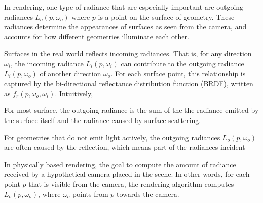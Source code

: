 In rendering, one type of radiance that are especially important are outgoing radiances $L_o(p,\omega_o)$ where $p$ is a point on the surface of geometry. These radiances determine the appearances of surfaces as seen from the camera, and accounts for how different geometries illuminate each other. 

Surfaces in the real world reflects incoming radiances. That is, for any direction $\omega_i$, the incoming radiance $L_i(p,\omega_i)$ can contribute to the outgoing radiance $L_i(p,\omega_o)$ of another direction $\omega_o$. For each surface point, this relationship is captured by the bi-directional reflectance distribution function (BRDF), written as $f_r(p,\omega_o,\omega_i)$. Intuitively, 


For most surface, the outgoing radiance is the sum of the the radiance emitted by the surface itself and the radiance caused by surface scattering. 

For geometries that do not emit light actively, the outgoing radiances $L_o(p,\omega_o)$ are often caused by the reflection, which means part of the radiances incident 

In physically based rendering, the goal to compute the amount of radiance received by a hypothetical camera placed in the scene. In other words, for each point $p$ that is visible from the camera, the rendering algorithm computes $L_o(p,\omega_o)$, where $\omega_o$ points from $p$ towards the camera. 